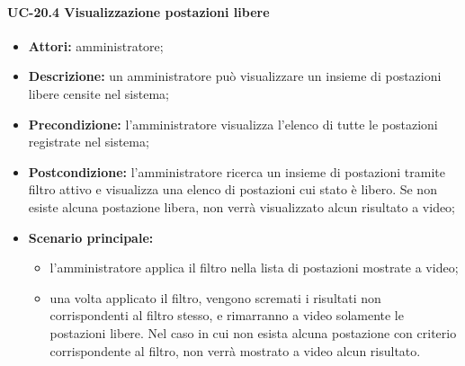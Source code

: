 \paragraph{UC-20.4 Visualizzazione postazioni libere}
\begin{itemize}
    \item \textbf{Attori:} amministratore;
    \item \textbf{Descrizione:} un amministratore pu\`{o} visualizzare un insieme di postazioni libere censite nel sistema;
    \item \textbf{Precondizione:} l'amministratore visualizza l'elenco di tutte le postazioni registrate nel sistema;
    \item \textbf{Postcondizione:} l'amministratore ricerca un insieme di postazioni tramite filtro attivo e visualizza una elenco di postazioni cui stato è libero. Se non esiste alcuna postazione libera, non verrà visualizzato alcun risultato a video;
    \item \textbf{Scenario principale:}
    \begin{itemize}
        \item l'amministratore applica il filtro nella lista di postazioni mostrate a video;
        \item una volta applicato il filtro, vengono scremati i risultati non corrispondenti al filtro stesso, e rimarranno a video solamente le postazioni libere. Nel caso in cui non esista alcuna postazione con criterio corrispondente al filtro, non verrà mostrato a video alcun risultato.
    \end{itemize}
\end{itemize}

